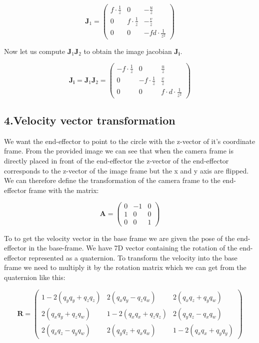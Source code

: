 \documentclass[a4paper,12pt]{article}
\begin{document}
\[
\mathbf{J}_1 = \begin{pmatrix}
f \cdot \frac{1}{z} & 0 & -\frac{u}{z} \\
0 & f \cdot \frac{1}{z} & -\frac{v}{z} \\
0 & 0 & -f d \cdot \frac{1}{z^2}
\end{pmatrix}
\]

Now let us compute $\mathbf{J}_1\mathbf{J}_2$ to obtain the image jacobian $\mathbf{J_i}$.

\[
\mathbf{J_i} = \mathbf{J}_1\mathbf{J}_2 = \begin{pmatrix}
-f \cdot \frac{1}{z} & 0 & \frac{u}{z} \\
0 & -f \cdot \frac{1}{z} & \frac{v}{z} \\
0 & 0 & f \cdot d \cdot \frac{1}{z^2}
\end{pmatrix}
\]


\subsection*{4.Velocity vector transformation}
We want the end-effector to point to the circle with the z-vector of it's coordinate frame. From the provided image we can see that when the camera frame is directly placed in front of the end-effector the z-vector of the end-effector corresponds to the z-vector of the image frame but the x and y axis are flipped. We can therefore define the transformation of the camera frame to the end-effector frame with the matrix:

\[
\mathbf{A} = \begin{pmatrix}
0 & -1 & 0 \\
1 & 0 & 0 \\
0 & 0 & 1
\end{pmatrix}
\]

To to get the velocity vector in the base frame we are given the pose of the end-effector in the base-frame. We have 7D vector containing the rotation of the end-effector represented as a quaternion. To transform the velocity into the base frame we need to multiply it by the rotation matrix which we can get from the quaternion like this:

\[
\mathbf{R} = \begin{pmatrix}
1-2(q_y q_y + q_z q_z) & 2(q_x q_y - q_z q_w) & 2(q_x q_z + q_y q_w) \\
 2(q_x q_y + q_z q_w) & 1-2(q_x q_x + q_z q_z) & 2(q_y q_z - q_x q_w) \\
 2(q_x q_z - q_y q_w) & 2(q_y q_z + q_x q_w) & 1-2(q_x q_x + q_y q_y)
\end{pmatrix}
\]
\end{document}
